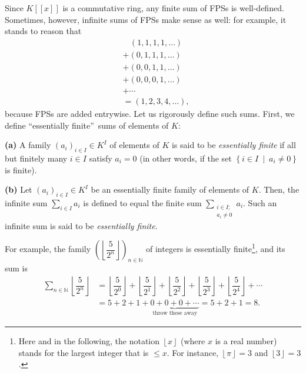 Since $K\left[  \left[  x\right]  \right]  $ is a commutative ring, any finite
sum of FPSs is well-defined. Sometimes, however, infinite sums of FPSs make
sense as well: for example, it stands to reason that%
\begin{align}
&  \ \ \ \ \left(  1,1,1,1,\ldots\right) \nonumber\\
&  +\left(  0,1,1,1,\ldots\right) \nonumber\\
&  +\left(  0,0,1,1,\ldots\right) \nonumber\\
&  +\left(  0,0,0,1,\ldots\right) \nonumber\\
&  +\cdots\nonumber\\
&  =\left(  1,2,3,4,\ldots\right)  , \label{eq.fps.summable.exa1}%
\end{align}
because FPSs are added entrywise. Let us rigorously define such sums. First,
we define \textquotedblleft essentially finite\textquotedblright\ sums of
elements of $K$:

\begin{definition}
\label{def.infsum.essfin}\textbf{(a)} A family $\left(  a_{i}\right)  _{i\in
I}\in K^{I}$ of elements of $K$ is said to be \emph{essentially finite} if all
but finitely many $i\in I$ satisfy $a_{i}=0$ (in other words, if the set
$\left\{  i\in I\ \mid\ a_{i}\neq0\right\}  $ is finite). \medskip

\textbf{(b)} Let $\left(  a_{i}\right)  _{i\in I}\in K^{I}$ be an essentially
finite family of elements of $K$. Then, the infinite sum $\sum_{i\in I}a_{i}$
is defined to equal the finite sum $\sum_{\substack{i\in I;\\a_{i}\neq0}%
}a_{i}$. Such an infinite sum is said to be \emph{essentially finite}.
\end{definition}

For example, the family $\left(  \left\lfloor \dfrac{5}{2^{n}}\right\rfloor
\right)  _{n\in\mathbb{N}}$ of integers is essentially finite\footnote{Here
and in the following, the notation $\left\lfloor x\right\rfloor $ (where $x$
is a real number) stands for the largest integer that is $\leq x$. For
instance, $\left\lfloor \pi\right\rfloor =3$ and $\left\lfloor 3\right\rfloor
=3$.}, and its sum is%
\begin{align*}
\sum_{n\in\mathbb{N}}\left\lfloor \dfrac{5}{2^{n}}\right\rfloor  &
=\left\lfloor \dfrac{5}{2^{0}}\right\rfloor +\left\lfloor \dfrac{5}{2^{1}%
}\right\rfloor +\left\lfloor \dfrac{5}{2^{2}}\right\rfloor +\left\lfloor
\dfrac{5}{2^{3}}\right\rfloor +\left\lfloor \dfrac{5}{2^{4}}\right\rfloor
+\cdots\\
&  =5+2+1+\underbrace{0+0+0+\cdots}_{\text{throw these away}}=5+2+1=8.
\end{align*}


